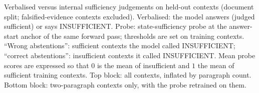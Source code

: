 \begin{table}[t]
\centering\scriptsize
\setlength{\tabcolsep}{3pt}

\caption{Verbalised versus internal sufficiency judgements on held-out contexts (document split; falsified-evidence contexts excluded). Verbalised: the model answers (judged sufficient) or says INSUFFICIENT. Probe: state-sufficiency probe at the answer-start anchor of the same forward pass; thresholds are set on training contexts. ``Wrong abstentions'': sufficient contexts the model called INSUFFICIENT; ``correct abstentions'': insufficient contexts it called INSUFFICIENT. Mean probe scores are expressed so that $0$ is the mean of insufficient and $1$ the mean of sufficient training contexts. Top block: all contexts, inflated by paragraph count. Bottom block: two-paragraph contexts only, with the probe retrained on them.}
\label{tab:verbal_internal}
\end{table}

